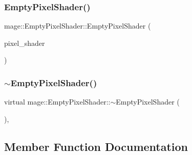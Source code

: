 \hypertarget{classmage_1_1_empty_pixel_shader_a151ae6546500995e33d34d0a2bfc5f49}{}\label{classmage_1_1_empty_pixel_shader_a151ae6546500995e33d34d0a2bfc5f49} 
\subsubsection{\texorpdfstring{Empty\+Pixel\+Shader()}{EmptyPixelShader()}\hspace{0.1cm}{\footnotesize\ttfamily [3/3]}}
{\footnotesize\ttfamily mage\+::\+Empty\+Pixel\+Shader\+::\+Empty\+Pixel\+Shader (\begin{DoxyParamCaption}\item[{\hyperlink{classmage_1_1_empty_pixel_shader}{Empty\+Pixel\+Shader} \&\&}]{pixel\+\_\+shader }\end{DoxyParamCaption})\hspace{0.3cm}{\ttfamily [default]}}

\hypertarget{classmage_1_1_empty_pixel_shader_ace5053e12d6fa60caa2bcca00d192fab}{}\label{classmage_1_1_empty_pixel_shader_ace5053e12d6fa60caa2bcca00d192fab} 
\subsubsection{\texorpdfstring{$\sim$\+Empty\+Pixel\+Shader()}{~EmptyPixelShader()}}
{\footnotesize\ttfamily virtual mage\+::\+Empty\+Pixel\+Shader\+::$\sim$\+Empty\+Pixel\+Shader (\begin{DoxyParamCaption}{ }\end{DoxyParamCaption})\hspace{0.3cm}{\ttfamily [virtual]}, {\ttfamily [default]}}



\subsection{Member Function Documentation}
\hypertarget{classmage_1_1_empty_pixel_shader_ababff79ea9746a94b838bb2f8dfd1fbf}{}\label{classmage_1_1_empty_pixel_shader_ababff79ea9746a94b838bb2f8dfd1fbf} 
